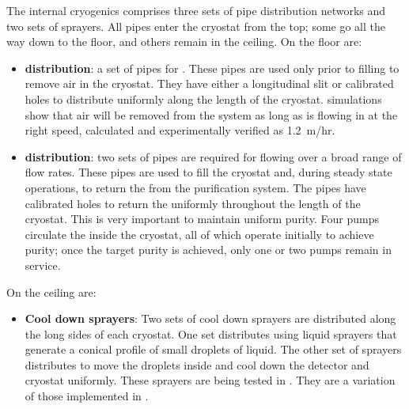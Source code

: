 \label{sec:fdsp-tc-internal-cryo}

The internal cryogenics comprises three sets of pipe distribution networks and two sets of sprayers. All pipes enter the cryostat from the top; some go all the way down to the floor, and others remain in the ceiling. On the floor are:
\begin{itemize}
\setlength\itemsep{1mm}
\setlength{\parsep}{1mm}
\setlength{\itemsep}{-5mm}
\item \textbf{ distribution}: a set of pipes %
for . These pipes are used only prior to filling %
to remove air %
in the cryostat. They have either a longitudinal slit or calibrated holes to distribute  uniformly along the length of the cryostat. 
 simulations show that air will be removed from the system as long as  is flowing in at the right speed, calculated and experimentally verified as \SI{1.2}{m/hr}.  


\item \textbf{ distribution}: two sets of pipes are required for flowing 
 over a broad  range of flow rates. These pipes are used to fill the cryostat and, during steady state operations, to return the  from the purification  system. The pipes have calibrated holes to return the  uniformly throughout the length of the cryostat. This is very important %
to maintain uniform purity. Four pumps circulate the  inside the cryostat, all of which operate %
initially to achieve purity; %
once the target purity is achieved, only one or two pumps remain in service. %
\end{itemize}

On the ceiling are:

\begin{itemize}
\setlength\itemsep{1mm}
\setlength{\parsep}{1mm}
\setlength{\itemsep}{-5mm}
\item \textbf{Cool down sprayers}: Two sets of cool down sprayers are distributed along the long sides of each cryostat. One set distributes  using liquid sprayers that generate a conical profile of small droplets of liquid. The other set of sprayers distributes  to move the  droplets inside and cool down the detector and cryostat uniformly. These sprayers are being tested in . They are a variation of those implemented in .
\end{itemize}

